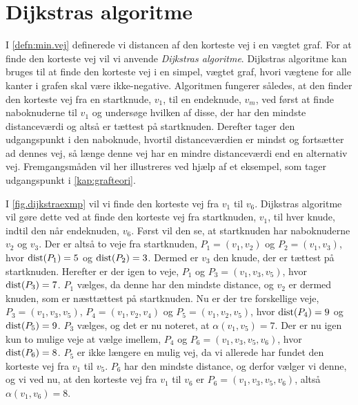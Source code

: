 \section{Dijkstras algoritme} \label{kap:dijkstras}
I \autoref{defn:min.vej} definerede vi distancen af den korteste vej i en vægtet graf. For at finde den korteste vej vil vi anvende \emph{Dijkstras algoritme}. Dijkstras algoritme kan bruges til at finde den korteste vej i en simpel, vægtet graf, hvori vægtene for alle kanter i grafen skal være ikke-negative. Algoritmen fungerer således, at den finder den korteste vej fra en startknude, $v_{1}$, til en endeknude, $v_{m}$, ved først at finde naboknuderne til $v_{1}$ og undersøge hvilken af disse, der har den mindste distanceværdi og altså er tættest på startknuden. Derefter tager den udgangspunkt i den naboknude, hvortil distanceværdien er mindst og fortsætter ad dennes vej, så længe denne vej har en mindre distanceværdi end en alternativ vej. Fremgangsmåden vil her illustreres ved hjælp af et eksempel, som tager udgangspunkt i \autoref{kap:grafteori}.

\begin{exmp} \label{exmp.dijkstae}

I \autoref{fig.dijkstraexmp} vil vi finde den korteste vej fra $v_{1}$ til $v_{6}$. Dijkstras algoritme vil gøre dette ved at finde den korteste vej fra startknuden, $v_{1}$, til hver knude, indtil den når endeknuden, $v_{6}$. Først vil den se, at startknuden har naboknuderne $v_{2}$ og $v_{3}$. Der er altså to veje fra startknuden, $P_1=(v_{1},v_{2})$  og $P_2=(v_{1},v_{3})$, hvor $\textrm{dist}(P_1)=5$ og $\textrm{dist}(P_2)=3$. Dermed er $v_{3}$ den knude, der er tættest på startknuden. Herefter er der igen to veje, $P_1$ og $P_3=(v_{1},v_{3},v_{5})$, hvor $\textrm{dist}(P_3)=7$. $P_1$ vælges, da denne har den mindste distance, og $v_{2}$ er dermed knuden, som er næsttættest på startknuden. Nu er der tre forskellige veje, $P_3=(v_{1},v_{3}, v_{5})$, 
$P_4=(v_{1},v_{2}, v_{4})$ og $P_5=(v_{1},v_{2}, v_{5})$, hvor $\textrm{dist}(P_4)=9$ og $\textrm{dist}(P_5)=9$. $P_3$ vælges, og det er nu noteret, at $\alpha(v_{1},v_5)=7$. Der er nu igen kun to mulige veje at vælge imellem, $P_4$ og $P_6=(v_{1},v_{3}, v_{5}, v_{6})$, hvor $\textrm{dist}(P_6)=8$. $P_5$ er ikke længere en mulig vej, da vi allerede har fundet den korteste vej fra $v_{1}$ til $v_{5}$. $P_6$ har den mindste distance, og derfor vælger vi denne, og vi ved nu, at den korteste vej fra $v_{1}$ til $v_{6}$ er $P_6=(v_{1},v_{3}, v_{5}, v_{6})$, altså $\alpha(v_1,v_6)=8$.

\end{exmp}

